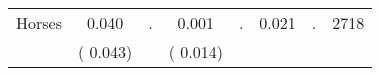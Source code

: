 \begin{tabular}{l*{7}{c}}
 Horses       &              0.040       &            .  &              0.001       &            .  &              0.021       &                  . &  2718 \\ 
                       &       (       0.043)             &                               &       (       0.014)                     &                               &                                               &                                &                      \\ 

\hline \end{tabular}